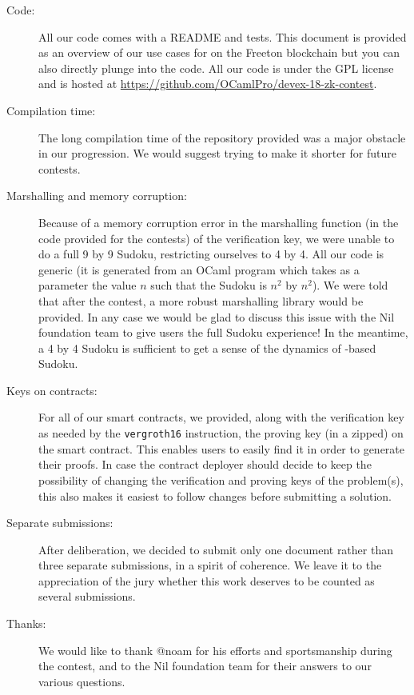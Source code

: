 \documentclass[10pt,a4paper]{article}
\begin{document}
\begin{description}
	\item[Code:] All our code comes with a README and tests. This document is provided as an overview of our use cases for \zksnarks{} on the Freeton blockchain but you can also directly plunge into the code. All our code is under the GPL license and is hosted at \url{https://github.com/OCamlPro/devex-18-zk-contest}.

	\item[Compilation time:] The long compilation time of the repository provided was a major obstacle in our progression. We would suggest trying to make it shorter for future contests.

	\item[Marshalling and memory corruption:] Because of a memory
          corruption error in the marshalling function (in the code
          provided for the contests) of the verification key, we were
          unable to do a full 9 by 9 Sudoku, restricting ourselves to
          4 by 4. All our code is generic (it is generated from an
          OCaml program which takes as a parameter the value $n$ such
          that the Sudoku is $n^2$ by $n^2$). We were told that after
          the contest, a more robust marshalling library would be
          provided. In any case we would be glad to discuss this issue
          with the Nil foundation team to give users the full Sudoku
          experience! In the meantime, a 4 by 4 Sudoku is sufficient
          to get a sense of the dynamics of \zksnark-based Sudoku.

	\item[Keys on contracts: ] For all of our smart contracts, we provided, along with the verification key as needed by the \verb|vergroth16| instruction, the proving key (in a zipped) on the smart contract. This enables users to easily find it in order to generate their proofs. In case the contract deployer should decide to keep the possibility of changing the verification and proving keys of the problem(s), this also makes it easiest to follow changes before submitting a solution.

    \item[Separate submissions:] After deliberation, we decided to submit only one document rather than three separate submissions, in a spirit of coherence. We leave it to the appreciation of the jury whether this work deserves to be counted as several submissions.

	\item[Thanks:] We would like to thank @noam for his efforts and sportsmanship during the contest, and to the Nil foundation team for their answers to our various questions.
\end{description}
\end{document}
